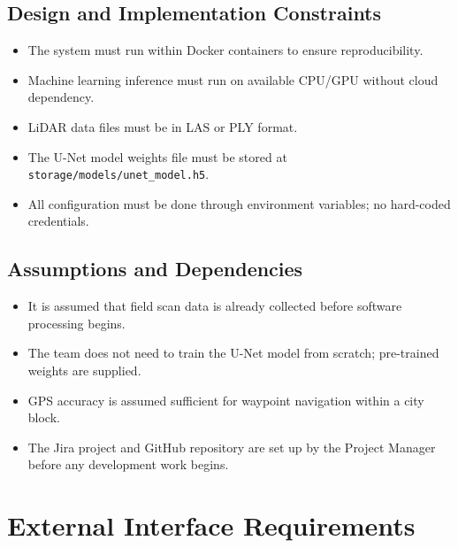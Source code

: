 \documentclass{article}
\begin{document}
\subsection{Design and Implementation Constraints}
\begin{itemize}
  \item The system must run within Docker containers to ensure reproducibility.
  \item Machine learning inference must run on available CPU/GPU without cloud dependency.
  \item LiDAR data files must be in LAS or PLY format.
  \item The U-Net model weights file must be stored at \texttt{storage/models/unet\_model.h5}.
  \item All configuration must be done through environment variables; no hard-coded credentials.
\end{itemize}

\subsection{Assumptions and Dependencies}
\begin{itemize}
  \item It is assumed that field scan data is already collected before software processing begins.
  \item The team does not need to train the U-Net model from scratch; pre-trained weights are
    supplied.
  \item GPS accuracy is assumed sufficient for waypoint navigation within a city block.
  \item The Jira project and GitHub repository are set up by the Project Manager before any
    development work begins.
\end{itemize}


\section{External Interface Requirements}
\label{sec:interfaces}
\end{document}

